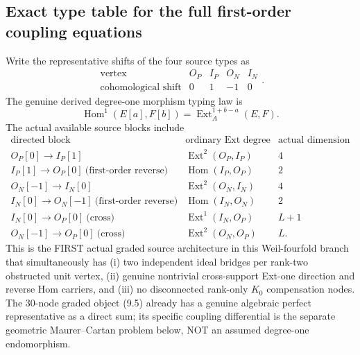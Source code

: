 \documentclass[11pt,a4paper]{article}
\begin{document}
\subsection*{Exact type table for the full first-order coupling equations}
Write the representative
shifts of the four
source types as
\[
 \begin{array}{c|cccc}
 \text{vertex}&O_{P}&I_{P}&O_N&I_N\\
 \text{cohomological shift}&0&1&-1&0
 \end{array}.
\]
The genuine derived
degree-one morphism
typing law is
\[
 \operatorname{Hom}^{1}(E[a],F[b])
       =\operatorname{Ext}^{1+b-a}_A(E,F).
\]
The actual available
source blocks include
\[
 \begin{array}{c|c|c}
 \text{directed block}&
     \text{ordinary Ext degree}&\text{actual dimension}\\
 O_P[0]\to I_P[1]&
      \operatorname{Ext}^2(O_P,I_P)&4\\
 I_P[1]\to O_P[0]\ \text{(first-order reverse)}
      &\operatorname{Hom}(I_P,O_P)&2\\
 O_N[-1]\to I_N[0]&
      \operatorname{Ext}^2(O_N,I_N)&4\\
 I_N[0]\to O_N[-1]\ \text{(first-order reverse)}
      &\operatorname{Hom}(I_N,O_N)&2\\
 I_N[0]\to O_P[0]\ \text{(cross)}
      &\operatorname{Ext}^1(I_N,O_P)&L+1\\
 O_N[-1]\to O_P[0]\ \text{(cross)}
      &\operatorname{Ext}^2(O_N,O_P)&L .
 \end{array}                                              \tag{9.9}
\]
This is the FIRST
actual graded source
architecture in this
Weil-fourfold branch
that simultaneously
has (i) two independent
ideal bridges per
rank-two obstructed
unit vertex,
(ii) genuine
nontrivial
cross-support
Ext-one direction
and reverse Hom
carriers, and
(iii) no disconnected
rank-only \(K_0\)
compensation nodes.
The 30-node graded
object (9.5) already
has a genuine algebraic
perfect representative
as a direct sum;
its specific coupling
differential is the
separate geometric
Maurer--Cartan problem
below, NOT an
assumed degree-one
endomorphism.
\end{document}
